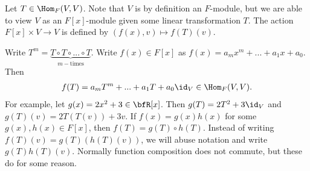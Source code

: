     \begin{example}
        Let $T \in \Hom_F{(V,V)}$. Note that $V$ is by definition an $F$-module, but we are able to view $V$ as an $F[x]$-module given some linear transformation $T$. The action $ F[x] \times V \rightarrow V$ is defined by $(f(x),v) \mapsto f(T)(v)$.

        Write $T^m = \underbrace{T \circ T \circ ... \circ T}_{m-\text{times}}$. Write $f(x) \in F[x]$ as $f(x) = a_mx^m + ... + a_1x + a_0$. Then
            \begin{equation*}
            \begin{split}
                f(T) = a_m T^m + ... + a_1 T + a_0 \id_V \in \Hom_F{(V,V)}.
            \end{split}
            \end{equation*}
        For example, let $g(x) = 2x^2 + 3 \in \bfR[x]$. Then $g(T) = 2T^2 + 3\id_V$ and $g(T)(v) = 2T(T(v)) + 3v$. If $f(x) = g(x)h(x)$ for some $g(x),h(x) \in F[x]$, then $f(T) = g(T) \circ h(T)$. Instead of writing $f(T)(v) = g(T)(h(T)(v))$, we will abuse notation and write $g(T)h(T)(v)$. Normally function composition does not commute, but these do {\color{red} for some reason}.
    \end{example}

